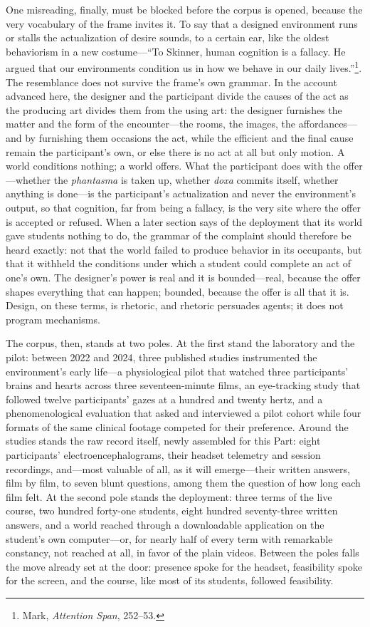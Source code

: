 One misreading, finally, must be blocked before the corpus is opened, because the very vocabulary of the frame invites it. To say that a designed environment runs or stalls the actualization of desire sounds, to a certain ear, like the oldest behaviorism in a new costume---``To Skinner, human cognition is a fallacy. He argued that our environments condition us in how we behave in our daily lives.''\footnote{Mark, \textit{Attention Span}, 252--53.}. The resemblance does not survive the frame's own grammar. In the account advanced here, the designer and the participant divide the causes of the act as the producing art divides them from the using art: the designer furnishes the matter and the form of the encounter---the rooms, the images, the affordances---and by furnishing them occasions the act, while the efficient and the final cause remain the participant's own, or else there is no act at all but only motion. A world conditions nothing; a world offers. What the participant does with the offer---whether the \textit{phantasma} is taken up, whether \textit{doxa} commits itself, whether anything is done---is the participant's actualization and never the environment's output, so that cognition, far from being a fallacy, is the very site where the offer is accepted or refused. When a later section says of the deployment that its world gave students nothing to do, the grammar of the complaint should therefore be heard exactly: not that the world failed to produce behavior in its occupants, but that it withheld the conditions under which a student could complete an act of one's own. The designer's power is real and it is bounded---real, because the offer shapes everything that can happen; bounded, because the offer is all that it is. Design, on these terms, is rhetoric, and rhetoric persuades agents; it does not program mechanisms.

The corpus, then, stands at two poles. At the first stand the laboratory and the pilot: between 2022 and 2024, three published studies instrumented the environment's early life---a physiological pilot that watched three participants' brains and hearts across three seventeen-minute films, an eye-tracking study that followed twelve participants' gazes at a hundred and twenty hertz, and a phenomenological evaluation that asked and interviewed a pilot cohort while four formats of the same clinical footage competed for their preference. Around the studies stands the raw record itself, newly assembled for this Part: eight participants' electroencephalograms, their headset telemetry and session recordings, and---most valuable of all, as it will emerge---their written answers, film by film, to seven blunt questions, among them the question of how long each film felt. At the second pole stands the deployment: three terms of the live course, two hundred forty-one students, eight hundred seventy-three written answers, and a world reached through a downloadable application on the student's own computer---or, for nearly half of every term with remarkable constancy, not reached at all, in favor of the plain videos. Between the poles falls the move already set at the door: presence spoke for the headset, feasibility spoke for the screen, and the course, like most of its students, followed feasibility.


